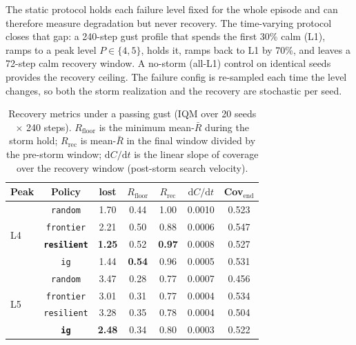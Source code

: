 \documentclass[12pt,a4paper]{article}
\begin{document}
The static protocol holds each failure level fixed for the whole episode and
can therefore measure degradation but never recovery. The time-varying
protocol closes that gap: a 240-step gust profile that spends the first 30\%
calm (L1), ramps to a peak level $P \in \{4, 5\}$, holds it, ramps back to L1
by 70\%, and leaves a 72-step calm recovery window. A no-storm (all-L1)
control on identical seeds provides the recovery ceiling. The failure config
is re-sampled each time the level changes, so both the storm realization and
the recovery are stochastic per seed.

\begin{table}[h]
\centering
\caption{Recovery metrics under a passing gust (IQM over 20 seeds $\times$ 240
steps). $R_{\mathrm{floor}}$ is the minimum mean-$\bar R$ during the storm
hold; $R_{\mathrm{rec}}$ is mean-$\bar R$ in the final window divided by the
pre-storm window; $\mathrm{d}C/\mathrm{d}t$ is the linear slope of coverage
over the recovery window (post-storm search velocity).}
\label{tab:p4}
\small
\begin{tabular}{lcccccc}
\toprule
Peak & Policy & lost & $R_{\mathrm{floor}}$ & $R_{\mathrm{rec}}$ & $\mathrm{d}C/\mathrm{d}t$ & Cov$_{\mathrm{end}}$ \\
\midrule
\multirow{4}{*}{L4}
 & \texttt{random}    & 1.70 & 0.44 & 1.00 & 0.0010 & 0.523 \\
 & \texttt{frontier}  & 2.21 & 0.50 & 0.88 & 0.0006 & 0.547 \\
 & \textbf{\texttt{resilient}} & \textbf{1.25} & 0.52 & \textbf{0.97} & 0.0008 & 0.527 \\
 & \texttt{ig}        & 1.44 & \textbf{0.54} & 0.96 & 0.0005 & 0.531 \\
\midrule
\multirow{4}{*}{L5}
 & \texttt{random}    & 3.47 & 0.28 & 0.77 & 0.0007 & 0.456 \\
 & \texttt{frontier}  & 3.01 & 0.31 & 0.77 & 0.0004 & 0.534 \\
 & \texttt{resilient} & 3.28 & 0.35 & 0.78 & 0.0004 & 0.504 \\
 & \textbf{\texttt{ig}} & \textbf{2.48} & 0.34 & 0.80 & 0.0003 & 0.522 \\
\bottomrule
\end{tabular}
\end{table}
\end{document}
